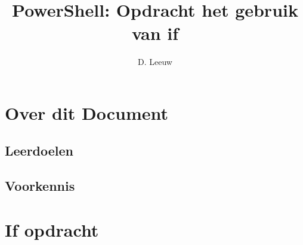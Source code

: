\documentclass[a4paper,12pt,twoside,openright,titlepage]{article}
\author{D. Leeuw}
\title{PowerShell: Opdracht het gebruik van if}
\date{\today\\
0.0.0 \\
\vfill
\raggedright
\copyright\ 2026 Dennis Leeuw\\
}
\begin{document}

\maketitle


\section{Over dit Document}
\subsection{Leerdoelen}
\subsection{Voorkennis}


\section{If opdracht}


\printindex
\end{document}
